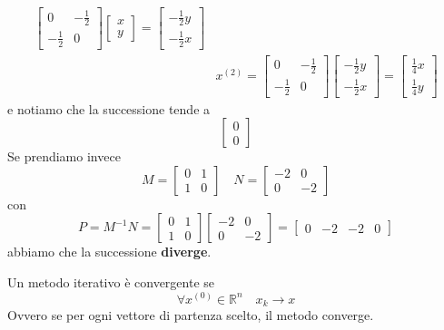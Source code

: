 \begin{example}
\begin{equation*}
\begin{split}
\begin{bmatrix}
				0 & -\frac{1}{2} \\ -\frac{1}{2} & 0
			\end{bmatrix} \begin{bmatrix}
			x \\ y
			\end{bmatrix} = \begin{bmatrix}
			-\frac{1}{2} y \\ -\frac{1}{2} x
			\end{bmatrix} \\
			& x^{(2)} =  \begin{bmatrix}
				0 & -\frac{1}{2} \\ -\frac{1}{2} & 0
			\end{bmatrix} \begin{bmatrix}
				-\frac{1}{2}y \\ -\frac{1}{2}x
			\end{bmatrix} = \begin{bmatrix}
				\frac{1}{4} x \\ \frac{1}{4} y
			\end{bmatrix}
		\end{split}
	\end{equation*}
	e notiamo che la successione tende a 
	\begin{equation*}
		\begin{bmatrix}
			0 \\ 0
		\end{bmatrix}
	\end{equation*}
	Se prendiamo invece
	\begin{equation*}
		M=\begin{bmatrix}
			0 & 1 \\ 1 & 0
		\end{bmatrix} \quad
		N = \begin{bmatrix}
			-2 & 0 \\ 0 & -2
		\end{bmatrix}
	\end{equation*} con
	\begin{equation*}
		P = M^{-1}N = \begin{bmatrix}
			0 & 1 \\ 1 &0
		\end{bmatrix}\begin{bmatrix}
			-2 & 0 \\ 0 & -2
		\end{bmatrix} = \begin{bmatrix}
			0 &-2 & -2 & 0
		\end{bmatrix}
	\end{equation*}
	abbiamo che la successione \textbf{diverge}.
\end{example}
\begin{definition}
	Un metodo iterativo è convergente se
	\begin{equation}
		\forall x^{(0)} \in \mathbb{R}^n \quad x_k \to x
	\end{equation}
	Ovvero se per ogni vettore di partenza scelto, il metodo converge.
\end{definition}

